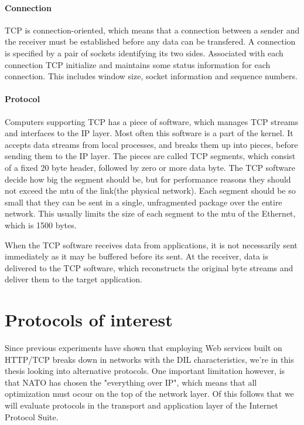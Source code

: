 \paragraph{Connection}

TCP is connection-oriented, which means that a connection between a sender and
the receiver must be established before any data can be transfered. A connection
is specified by a pair of sockets identifying its two sides. Associated with
each connection TCP initialize and maintains some status information for each
connection. This includes window size, socket information and sequence numbers.

\paragraph{Protocol}

Computers supporting TCP has a piece of software, which manages TCP streams and
interfaces to the IP layer. Most often this software is a part of the
kernel\cite{computer-networks}. It accepts data streams from local processes,
and breaks them up into pieces, before sending them to the IP layer. The pieces
are called TCP segments, which consist of a fixed 20 byte header, followed by
zero or more data byte. The TCP software decide how big the segment should be,
but for performance reasons they should not exceed the \gls{mtu} of the
link(the physical network). Each segment should be so small that they can be
sent in a single, unfragmented package over the entire network. This usually
limits the size of each segment to the \gls{mtu} of the Ethernet, which is 1500
bytes.

When the TCP software receives data from applications, it is not necessarily
sent immediately as it may be buffered before its sent. At the receiver, data is
delivered to the TCP software, which reconstructs the original byte streams and
deliver them to the target application.


\section{Protocols of interest}


Since previous experiments have shown that employing Web services built on
HTTP/TCP breaks down in networks with the DIL characteristics, we're in this
thesis looking into alternative protocols. One important limitation however, is
that NATO has chosen the "everything over IP", which means that all optimization
must ocour on the top of the network layer. Of this follows that we will
evaluate protocols in the transport and application layer of the Internet
Protocol Suite.

